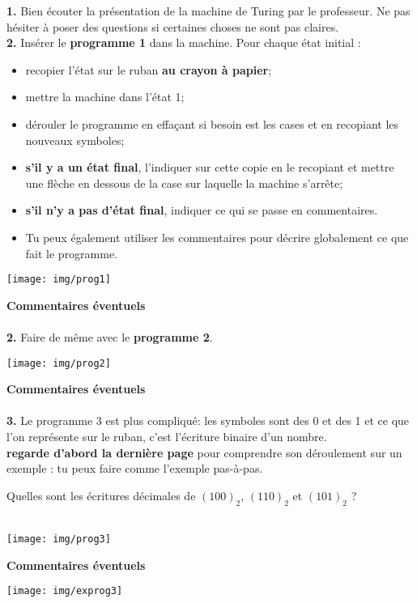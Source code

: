 \documentclass[12pt,a4paper,eval,firamath]{nsi}
\begin{document}
\maketitle

\textbf{1.} Bien écouter la présentation de la machine de Turing par le professeur. Ne pas hésiter à poser des questions si certaines choses ne sont pas claires.\\


\textbf{2.} Insérer le \textbf{programme 1}  dans la machine. Pour chaque état initial :
\begin{itemize}
	\item recopier l'état sur le ruban \textbf{au crayon à papier};
    \item mettre la machine dans l'état 1;
    \item dérouler le programme en effaçant si besoin est les cases et en recopiant les nouveaux symboles;
    \item \textbf{s'il y a un état final}, l'indiquer sur cette copie en le recopiant et mettre une flèche en dessous de la case sur laquelle la machine s'arrête;
    \item \textbf{s'il n'y a pas d'état final}, indiquer ce qui se passe en commentaires.
    \item  Tu peux également utiliser les commentaires pour décrire globalement ce que fait le programme.
\end{itemize}
\begin{center}
\texttt{[image: img/prog1]}
\end{center}
\newpage
\textbf{Commentaires éventuels}\\

\\

\textbf{2.} Faire de même avec le \textbf{programme 2}.

\begin{center}
\texttt{[image: img/prog2]}
\end{center}

\textbf{Commentaires éventuels}\\

\\

\textbf{3.} Le programme 3 est plus compliqué: les symboles sont des 0 et des 1 et ce que l'on représente sur le ruban, c'est l'écriture binaire d'un nombre.\\
\textbf{regarde d'abord la dernière page} pour comprendre son déroulement sur un exemple : tu peux faire comme l'exemple pas-à-pas.

Quelles sont les écritures décimales de $(100)_2$, $(110)_2$ et $(101)_2$ ?\\

\\




\begin{center}
\texttt{[image: img/prog3]}
\end{center}

\textbf{Commentaires éventuels}\\


\newpage
\texttt{[image: img/exprog3]}
\end{document}

